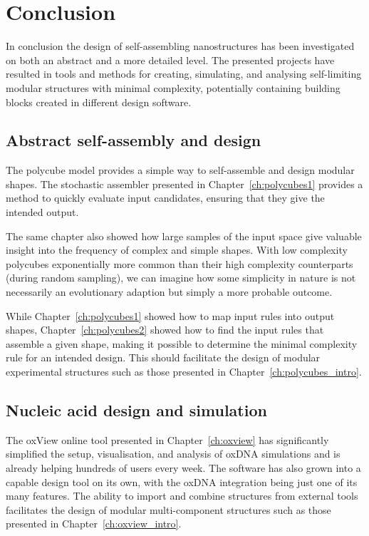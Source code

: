 \chapter{Conclusion}
\label{ch:conclusion}

In conclusion the design of self-assembling nanostructures has been investigated on both an abstract and a more detailed level. The presented projects have resulted in tools and methods for creating, simulating, and analysing self-limiting modular structures with minimal complexity, potentially containing building blocks created in different design software.


\section{Abstract self-assembly and design}

The polycube model provides a simple way to self-assemble and design modular shapes. The stochastic assembler presented in Chapter~\ref{ch:polycubes1} provides a method to quickly evaluate input candidates, ensuring that they give the intended output.

The same chapter also showed how large samples of the input space give valuable insight into the frequency of complex and simple shapes. With low complexity polycubes exponentially more common than their high complexity counterparts (during random sampling), we can imagine how some simplicity in nature is not necessarily an evolutionary adaption but simply a more probable outcome.

While Chapter~\ref{ch:polycubes1} showed how to map input rules into output shapes, Chapter~\ref{ch:polycubes2} showed how to find the input rules that assemble a given shape, making it possible to determine the minimal complexity rule for an intended design. This should facilitate the design of modular experimental structures such as those presented in Chapter~\ref{ch:polycubes_intro}.

\section{Nucleic acid design and simulation}

The oxView online tool presented in Chapter~\ref{ch:oxview} has significantly simplified the setup, visualisation, and analysis of oxDNA simulations and is already helping hundreds of users every week. The software has also grown into a capable design tool on its own, with the oxDNA integration being just one of its many features. The ability to import and combine structures from external tools facilitates the design of modular multi-component structures such as those presented in Chapter~\ref{ch:oxview_intro}.

